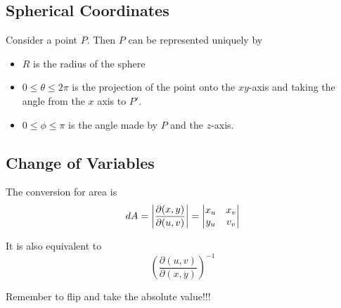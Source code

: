 \documentclass{article}
\begin{document}
\subsection{Spherical Coordinates}
\begin{definition}
  Consider a point $P$. Then $P$ can be represented uniquely by
  \begin{itemize}
    \item $R$ is the radius of the sphere
    \item $0 \leq \theta \leq 2\pi$ is the projection of the point onto the $xy$-axis and taking the angle from the $x$ axis to $P'$.
    \item $0 \leq \phi \leq \pi$ is the angle made by $P$ and the $z$-axis.
  \end{itemize}
\end{definition}
\subsection{Change of Variables}
\begin{theorem}
  The conversion for area is \[
    dA = \abs{\frac{\partial(x, y)}{\partial(u, v)}} =
    \begin{vmatrix}
      x_u & x_v\\
      y_u & v_v\\
    \end{vmatrix}
  \]

  It is also equivalent to \[
    \left(\frac{\partial(u, v)}{\partial(x, y)}\right)^{-1}
  \]
\end{theorem}
\begin{remark}
  Remember to flip and take the absolute value!!!
\end{remark}
\end{document}
